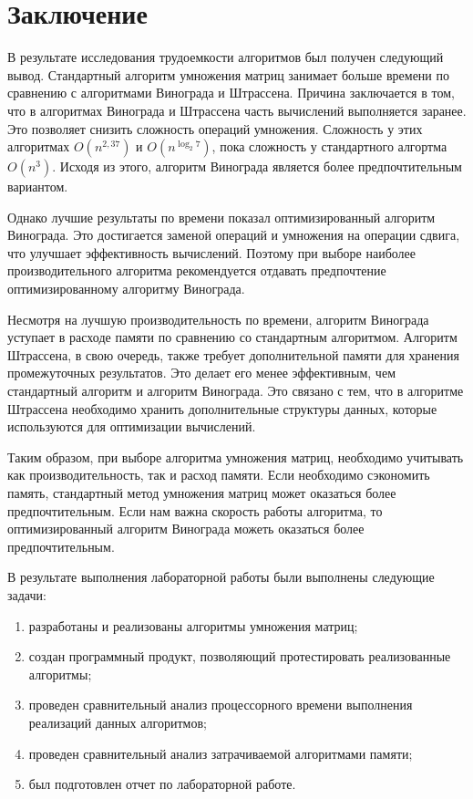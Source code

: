 \chapter*{Заключение}

В результате исследования трудоемкости алгоритмов был получен следующий вывод. Стандартный алгоритм умножения матриц занимает больше времени по сравнению с алгоритмами Винограда и Штрассена. 
Причина заключается в том, что в алгоритмах Винограда и Штрассена часть вычислений выполняется заранее. 
Это позволяет снизить сложность операций умножения. Сложность у этих алгоритмах $O(n^{2,37})$ и $O(n^{\log _{2}7})$, пока сложность у стандартного алгортма  $O(n^{3})$. 
Исходя из этого, алгоритм Винограда является более предпочтительным вариантом.

Однако лучшие результаты по времени показал оптимизированный алгоритм Винограда. 
Это достигается заменой операций и умножения на операции сдвига, что улучшает эффективность вычислений. 
Поэтому при выборе наиболее производительного алгоритма рекомендуется отдавать предпочтение оптимизированному алгоритму Винограда.

Несмотря на лучшую производительность по времени, алгоритм Винограда уступает в расходе памяти по сравнению со стандартным алгоритмом. 
Алгоритм Штрассена, в свою очередь, также требует дополнительной памяти для хранения промежуточных результатов. 
Это делает его менее эффективным, чем стандартный алгоритм и алгоритм Винограда. 
Это связано с тем, что в алгоритме Штрассена необходимо хранить дополнительные структуры данных, которые используются для оптимизации вычислений.

Таким образом, при выборе алгоритма умножения матриц, необходимо учитывать как производительность, так и расход памяти. 
Если необходимо сэкономить память, стандартный метод умножения матриц может оказаться более предпочтительным. 
Если нам важна скорость работы алгоритма, то оптимизированный алгоритм Винограда можеть оказаться более предпочтительным.

В результате выполнения лабораторной работы были выполнены следующие задачи: 
\begin{enumerate}[label={\arabic*)}]
	\item разработаны и реализованы алгоритмы умножения матриц;
	\item создан программный продукт, позволяющий протестировать реализованные алгоритмы;
	\item проведен сравнительный анализ процессорного времени выполнения реализаций данных алгоритмов;
	\item проведен сравнительный анализ затрачиваемой алгоритмами памяти;
	\item был подготовлен отчет по лабораторной работе.
\end{enumerate}
